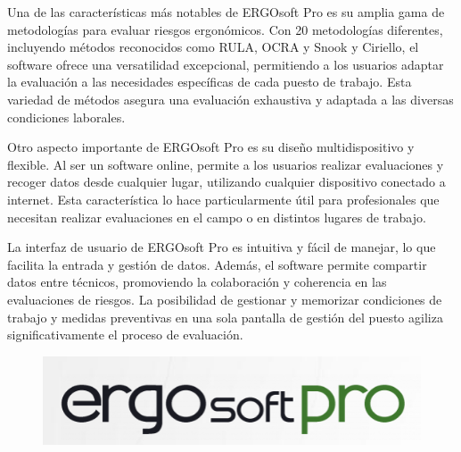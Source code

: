 Una de las características más notables de ERGOsoft Pro es su amplia gama de metodologías para evaluar riesgos ergonómicos. Con 20 metodologías diferentes, incluyendo métodos reconocidos como RULA, OCRA y Snook y Ciriello, el software ofrece una versatilidad excepcional, permitiendo a los usuarios adaptar la evaluación a las necesidades específicas de cada puesto de trabajo. Esta variedad de métodos asegura una evaluación exhaustiva y adaptada a las diversas condiciones laborales.

Otro aspecto importante de ERGOsoft Pro es su diseño multidispositivo y flexible. Al ser un software online, permite a los usuarios realizar evaluaciones y recoger datos desde cualquier lugar, utilizando cualquier dispositivo conectado a internet. Esta característica lo hace particularmente útil para profesionales que necesitan realizar evaluaciones en el campo o en distintos lugares de trabajo.

La interfaz de usuario de ERGOsoft Pro es intuitiva y fácil de manejar, lo que facilita la entrada y gestión de datos. Además, el software permite compartir datos entre técnicos, promoviendo la colaboración y coherencia en las evaluaciones de riesgos. La posibilidad de gestionar y memorizar condiciones de trabajo y medidas preventivas en una sola pantalla de gestión del puesto agiliza significativamente el proceso de evaluación.

\begin{figure}[ht]
\centering
\includegraphics[scale=.5]{content/img/logoergosoftpro.png}
\label{fig:logoERGOSoftPro}
\end{figure}

